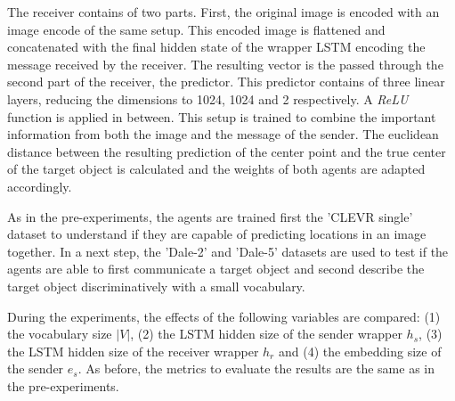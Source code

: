 The receiver contains of two parts.
First, the original image is encoded with an image encode of the same setup.
This encoded image is flattened and concatenated with the final hidden state of the wrapper LSTM encoding the message received by the receiver.
The resulting vector is the passed through the second part of the receiver, the predictor.
This predictor contains of three linear layers, reducing the dimensions to 1024, 1024 and 2 respectively.
A \emph{ReLU} function is applied in between.
This setup is trained to combine the important information from both the image and the message of the sender.
The euclidean distance between the resulting prediction of the center point and the true center of the target object is calculated and the weights of both agents are adapted accordingly.

As in the pre-experiments, the agents are trained first the 'CLEVR single' dataset to understand if they are capable of predicting locations in an image together.
In a next step, the 'Dale-2' and 'Dale-5' datasets are used to test if the agents are able to first communicate a target object and second describe the target object discriminatively with a small vocabulary.

During the experiments, the effects of the following variables are compared:
(1) the vocabulary size $|V|$,
(2) the LSTM hidden size of the sender wrapper $h_s$,
(3) the LSTM hidden size of the receiver wrapper $h_r$ and
(4) the embedding size of the sender $e_s$.
As before, the metrics to evaluate the results are the same as in the pre-experiments.

